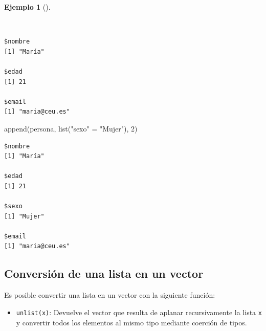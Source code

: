 \documentclass[
  a4paper,
]{scrreport}
\newenvironment{Shaded}{\begin{snugshade}}{\end{snugshade}}
\newcommand{\DecValTok}[1]{\textcolor[rgb]{0.68,0.00,0.00}{#1}}
\newcommand{\FunctionTok}[1]{\textcolor[rgb]{0.28,0.35,0.67}{#1}}
\newcommand{\NormalTok}[1]{\textcolor[rgb]{0.00,0.23,0.31}{#1}}
\newcommand{\OtherTok}[1]{\textcolor[rgb]{0.00,0.23,0.31}{#1}}
\newcommand{\SpecialCharTok}[1]{\textcolor[rgb]{0.37,0.37,0.37}{#1}}
\newcommand{\StringTok}[1]{\textcolor[rgb]{0.13,0.47,0.30}{#1}}
\providecommand{\tightlist}{%
  \setlength{\itemsep}{0pt}\setlength{\parskip}{0pt}}\usepackage{longtable,booktabs,array}
\theoremstyle{definition}
\theoremstyle{definition}
\newtheorem{example}{Ejemplo}[chapter]
\theoremstyle{remark}
\begin{document}
\begin{example}[]\protect\hypertarget{exm-añadir-elementos-listas}{}\label{exm-añadir-elementos-listas}

~

\begin{Shaded}
\end{Shaded}

\begin{verbatim}
$nombre
[1] "María"

$edad
[1] 21

$email
[1] "maria@ceu.es"
\end{verbatim}

\begin{Shaded}
\begin{Highlighting}[]
\FunctionTok{append}\NormalTok{(persona, }\FunctionTok{list}\NormalTok{(}\StringTok{"sexo"} \OtherTok{=} \StringTok{"Mujer"}\NormalTok{), }\DecValTok{2}\NormalTok{)}
\end{Highlighting}
\end{Shaded}

\begin{verbatim}
$nombre
[1] "María"

$edad
[1] 21

$sexo
[1] "Mujer"

$email
[1] "maria@ceu.es"
\end{verbatim}

\end{example}

\subsection{Conversión de una lista en un
vector}\label{conversiuxf3n-de-una-lista-en-un-vector}

Es posible convertir una lista en un vector con la siguiente función:

\begin{itemize}
\tightlist
\item
  \texttt{unlist(x)}: Devuelve el vector que resulta de aplanar
  recursivamente la lista \texttt{x} y convertir todos los elementos al
  mismo tipo mediante coerción de tipos.
\end{itemize}
\end{document}
